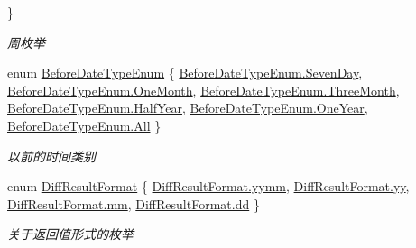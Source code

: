 \begin{DoxyCompactItemize}
 \}\begin{DoxyCompactList}\small\item\em 周枚举 \end{DoxyCompactList}
\item 
enum \hyperlink{class_x_c_l_net_tools_1_1_enum_1_1_common_enum_abac0e863746b7fb8e6364c17f61648ea}{Before\+Date\+Type\+Enum} \{ \newline
\hyperlink{class_x_c_l_net_tools_1_1_enum_1_1_common_enum_abac0e863746b7fb8e6364c17f61648eaa89cbb363380ec655e2457e3b8ed9bfbd}{Before\+Date\+Type\+Enum.\+Seven\+Day}, 
\hyperlink{class_x_c_l_net_tools_1_1_enum_1_1_common_enum_abac0e863746b7fb8e6364c17f61648eaafbf813f42cef34e971078c047da659f8}{Before\+Date\+Type\+Enum.\+One\+Month}, 
\hyperlink{class_x_c_l_net_tools_1_1_enum_1_1_common_enum_abac0e863746b7fb8e6364c17f61648eaacbfdf32b0a04388155151bd3e1606312}{Before\+Date\+Type\+Enum.\+Three\+Month}, 
\hyperlink{class_x_c_l_net_tools_1_1_enum_1_1_common_enum_abac0e863746b7fb8e6364c17f61648eaab718c33478a0f1c03a3e50a5bd46869e}{Before\+Date\+Type\+Enum.\+Half\+Year}, 
\newline
\hyperlink{class_x_c_l_net_tools_1_1_enum_1_1_common_enum_abac0e863746b7fb8e6364c17f61648eaae0e2407272c8d5ee6e131146067c7055}{Before\+Date\+Type\+Enum.\+One\+Year}, 
\hyperlink{class_x_c_l_net_tools_1_1_enum_1_1_common_enum_abac0e863746b7fb8e6364c17f61648eaab1c94ca2fbc3e78fc30069c8d0f01680}{Before\+Date\+Type\+Enum.\+All}
 \}\begin{DoxyCompactList}\small\item\em 以前的时间类别 \end{DoxyCompactList}
\item 
enum \hyperlink{class_x_c_l_net_tools_1_1_enum_1_1_common_enum_aaefa466811a65c8971576fcdb80354a4}{Diff\+Result\+Format} \{ \hyperlink{class_x_c_l_net_tools_1_1_enum_1_1_common_enum_aaefa466811a65c8971576fcdb80354a4a5db5c5d516e72790f7e16ba4f37edfdb}{Diff\+Result\+Format.\+yymm}, 
\hyperlink{class_x_c_l_net_tools_1_1_enum_1_1_common_enum_aaefa466811a65c8971576fcdb80354a4a2fb1c5cf58867b5bbc9a1b145a86f3a0}{Diff\+Result\+Format.\+yy}, 
\hyperlink{class_x_c_l_net_tools_1_1_enum_1_1_common_enum_aaefa466811a65c8971576fcdb80354a4ab3cd915d758008bd19d0f2428fbb354a}{Diff\+Result\+Format.\+mm}, 
\hyperlink{class_x_c_l_net_tools_1_1_enum_1_1_common_enum_aaefa466811a65c8971576fcdb80354a4a1aabac6d068eef6a7bad3fdf50a05cc8}{Diff\+Result\+Format.\+dd}
 \}\begin{DoxyCompactList}\small\item\em 关于返回值形式的枚举 \end{DoxyCompactList}

\end{DoxyCompactItemize}
